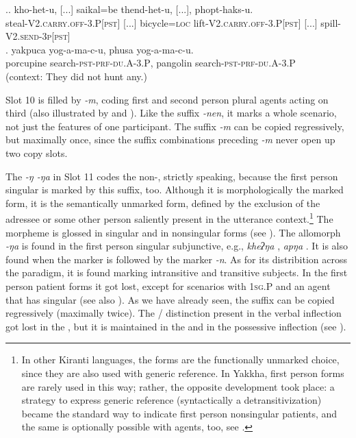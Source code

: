 \ex.\ag. kho-het-u, [...] saikal=be thend-het-u, [...],  phopt-haks-u.\\
steal{\scshape -V2.carry.off-3.P[pst]}  [...] bicycle{\scshape =loc} lift{\scshape -V2.carry.off-3.P[pst]} [...] spill{\scshape -V2.send-3p[pst]}\\
  
\bg. yakpuca   yog-a-ma-c-u, phusa    yog-a-ma-c-u.\\
porcupine   search{\scshape -pst-prf-du.A-3.P}, pangolin   search{\scshape -pst-prf-du.A-3.P}\\
 (context: They did not hunt any.) 
	
Slot  10 is filled by \emph{-m}, coding first and second person plural agents  acting on third  (also illustrated by \LLast[a] and \LLast[c]). Like the suffix \emph{-nen}, it marks a whole scenario, not just the features of one participant. The suffix \emph{-m} can be copied regressively, but maximally once, since the suffix combinations preceding \emph{-m} never open up two copy slots.
	
	
The   \emph{-ŋ \ti -ŋa} in Slot 11 codes the non-,  strictly speaking, because the first person singular is marked by this suffix, too. Although it is morphologically the  marked form,  it is the semantically unmarked form, defined by the exclusion of the adressee or some other person saliently present in the utterance context.\footnote{In other Kiranti languages, the  forms are the functionally unmarked choice, since they are also used with generic reference. In Yakkha, first person forms are rarely used in this way; rather, the opposite development took place: a strategy to express generic reference (syntactically a detransitivization) became the standard way to indicate first person nonsingular patients, and the same is optionally possible with agents, too, see .} The morpheme is glossed  in singular and   in nonsingular forms (see \Next). The allomorph \emph{-ŋa} is found in the first person singular subjunctive, e.g., \emph{kheʔŋa} , \emph{apŋa} . It is also found when the  marker is followed by the  marker \emph{-n}. As for its distribition across the paradigm, it is found marking intransitive and transitive subjects. In the first person patient forms it got lost, except for scenarios with {\scshape 1sg.P}  and an agent that has singular   (see also ). As we have already seen, the  suffix can be copied regressively (maximally twice). The / distinction present in the verbal inflection got lost in the , but it is maintained in the  and in the possessive inflection (see ). 

